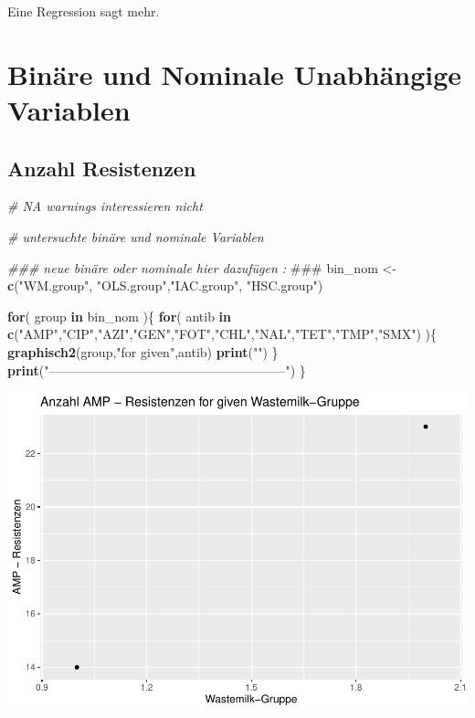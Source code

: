 \documentclass[
]{article}
\newenvironment{Shaded}{\begin{snugshade}}{\end{snugshade}}
\newcommand{\AlertTok}[1]{\textcolor[rgb]{0.94,0.16,0.16}{#1}}
\newcommand{\CommentTok}[1]{\textcolor[rgb]{0.56,0.35,0.01}{\textit{#1}}}
\newcommand{\ControlFlowTok}[1]{\textcolor[rgb]{0.13,0.29,0.53}{\textbf{#1}}}
\newcommand{\KeywordTok}[1]{\textcolor[rgb]{0.13,0.29,0.53}{\textbf{#1}}}
\newcommand{\NormalTok}[1]{#1}
\newcommand{\StringTok}[1]{\textcolor[rgb]{0.31,0.60,0.02}{#1}}
\begin{document}
Eine Regression sagt mehr.

\hypertarget{binuxe4re-und-nominale-unabhuxe4ngige-variablen}{%
\section{Binäre und Nominale Unabhängige
Variablen}\label{binuxe4re-und-nominale-unabhuxe4ngige-variablen}}

\hypertarget{anzahl-resistenzen}{%
\subsection{Anzahl Resistenzen}\label{anzahl-resistenzen}}

\begin{Shaded}
\begin{Highlighting}[]
\CommentTok{# NA warnings interessieren nicht}

\CommentTok{# untersuchte binäre und nominale Variablen }

\CommentTok{### neue binäre oder nominale hier dazufügen : }\AlertTok{###}
\NormalTok{bin_nom <-}\StringTok{ }\KeywordTok{c}\NormalTok{(}\StringTok{"WM.group"}\NormalTok{, }\StringTok{"OLS.group"}\NormalTok{,}\StringTok{"IAC.group"}\NormalTok{,   }\StringTok{"HSC.group"}\NormalTok{)       }

\ControlFlowTok{for}\NormalTok{( group }\ControlFlowTok{in}\NormalTok{ bin_nom )\{}
  \ControlFlowTok{for}\NormalTok{( antib }\ControlFlowTok{in} \KeywordTok{c}\NormalTok{(}\StringTok{"AMP"}\NormalTok{,}\StringTok{"CIP"}\NormalTok{,}\StringTok{"AZI"}\NormalTok{,}\StringTok{"GEN"}\NormalTok{,}\StringTok{"FOT"}\NormalTok{,}\StringTok{"CHL"}\NormalTok{,}\StringTok{"NAL"}\NormalTok{,}\StringTok{"TET"}\NormalTok{,}\StringTok{"TMP"}\NormalTok{,}\StringTok{"SMX"}\NormalTok{) )\{}
    \KeywordTok{graphisch2}\NormalTok{(group,}\StringTok{"for given"}\NormalTok{,antib)  }
    \KeywordTok{print}\NormalTok{(}\StringTok{""}\NormalTok{)}
\NormalTok{  \} }
  \KeywordTok{print}\NormalTok{(}\StringTok{"--------------------------------------------------------"}\NormalTok{)}
\NormalTok{\}}
\end{Highlighting}
\end{Shaded}

\includegraphics{NResistenzen_files/figure-latex/binary_or_nominal_variables-1.pdf}
\end{document}
